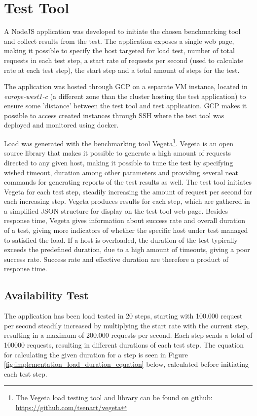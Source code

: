 \section{Test Tool}
A NodeJS application was developed to initiate the chosen benchmarking tool and collect results from the test. The application exposes a single web page, making it possible to specify the host targeted for load test, number of total requests in each test step, a start rate of requests per second (used to calculate rate at each test step), the start step and a total amount of steps for the test. 

The application was hosted through GCP on a separate VM instance, located in \textit{europe-west1-c} (a different zone than the cluster hosting the test application) to ensure some 'distance' between the test tool and test application. GCP makes it possible to access created instances through SSH where the test tool was deployed and monitored using docker.

Load was generated with the benchmarking tool Vegeta\footnote{The Vegeta load testing tool and library can be found on github: \url{https://github.com/tsenart/vegeta}}. Vegeta is an open source library that makes it possible to generate a high amount of requests directed to any given host, making it possible to tune the test by specifying wished timeout, duration among other parameters and providing several neat commands for generating reports of the test results as well. The test tool initiates Vegeta for each test step, steadily increasing the amount of request per second for each increasing step. Vegeta produces results for each step, which are gathered in a simplified JSON structure for display on the test tool web page. Besides response time, Vegeta gives information about success rate and overall duration of a test, giving more indicators of whether the specific host under test managed to satisfied the load. If a host is overloaded, the duration of the test typically exceeds the predefined duration, due to a high amount of timeouts, giving a poor success rate. Success rate and effective duration are therefore a product of response time.

\subsection{Availability Test}
The application has been load tested in 20 steps, starting with 100.000 request per second steadily increased by multiplying the start rate with the current step, resulting in a maximum of 200.000 requests per second. Each step sends a total of 100000 requests, resulting in different durations of each test step. The equation for calculating the given duration for a step is seen in Figure \ref{fig:implementation_load_duration_equation} below, calculated before initiating each test step.

